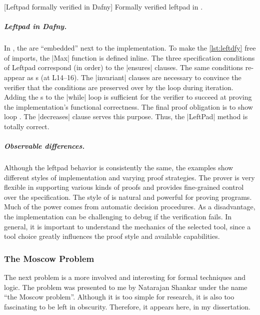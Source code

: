 \begin{center}
\begin{minipage}{\linewidth}
\captionsetup{type=lstlisting}
[Leftpad formally verified in Dafny]
{Formally verified leftpad in .}
\label{lst:leftdfy}
\end{minipage}
\end{center}

\subparagraph*{Leftpad in Dafny.}
In , the  are \enquote{embedded} next to the
implementation. To make the \autoref{lst:leftdfy} free of imports, the \pr|Max|
function is defined inline. The three specification conditions of Leftpad
correspond (in order) to the \pr|ensures| clauses. The same conditions re-appear
as s (at L14--16). The \pr|invariant| clauses are necessary
to convince the verifier that the conditions are preserved over by the loop
during iteration. Adding the s to the \pr|while| loop is
sufficient for the verifier to succeed at proving the implementation's
functional correctness. The final proof obligation is to show loop
. The \pr|decreases| clause serves this purpose. Thus, the
\pr|LeftPad| method is totally correct.

\subparagraph*{Observable differences.}
Although the leftpad behavior is consistently the same, the examples show
different styles of implementation and varying proof strategies. The 
prover is very flexible in supporting various kinds of proofs and provides
fine-grained control over the specification. The
 style of  is natural and powerful for
proving programs. Much of the power comes from automatic decision procedures. As
a disadvantage, the implementation can be challenging to debug if the
verification fails. In general, it is important to understand the mechanics of
the selected tool, since a tool choice greatly influences the proof style and
available capabilities.

\subsubsection{The Moscow Problem}
\label{subsec:moscow}

The next problem is a more involved and interesting for formal techniques and
logic. The problem was presented to me by Natarajan Shankar under the name
\enquote{the Moscow problem}. Although it is too simple for research, it is also
too fascinating to be left in obscurity. Therefore, it appears here, in my
dissertation.

